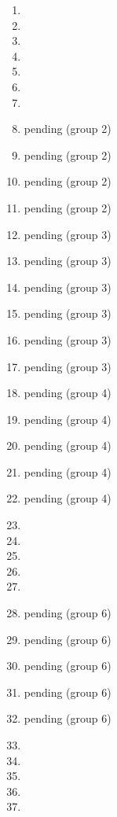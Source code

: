 \documentclass[12pt]{article}
\begin{document}


\begin{enumerate}
    \item 
    \item 
    \item 
    \item 
    \item 
    
    \item 
    \item 
    \item pending (group 2)
    \item pending (group 2)
    \item pending (group 2)
    \item pending (group 2)
    
    \item pending (group 3)
    \item pending (group 3)
    \item pending (group 3)
    \item pending (group 3)
    \item pending (group 3)
    \item pending (group 3)  
    
    \item pending (group 4)
    \item pending (group 4)
    \item pending (group 4)
    \item pending (group 4)
    \item pending (group 4)
    
    \item 
    \item 
    \item 
    \item 
    \item 
    
    \item pending (group 6)
    \item pending (group 6)
    \item pending (group 6)
    \item pending (group 6)
    \item pending (group 6)
    
    \item 
    \item  
    \item  
    \item 
    \item  
    

\end{enumerate}
\end{document}
